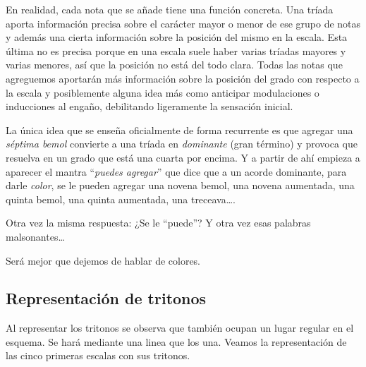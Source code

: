 \documentclass[]{report}
\begin{document}
En realidad, cada nota que se añade tiene una función concreta. Una tríada aporta información precisa sobre el carácter mayor o menor de ese grupo de notas y además una cierta información sobre la posición del mismo en la escala. Esta última no es precisa porque en una escala suele haber varias tríadas mayores y varias menores, así que la posición no está del todo clara. Todas las notas que agreguemos aportarán más información sobre la posición del grado con respecto a la escala y posiblemente alguna idea más como anticipar modulaciones o inducciones al engaño, debilitando ligeramente la sensación inicial.

La única idea que se enseña oficialmente de forma recurrente es que agregar una \emph{séptima bemol} convierte a una tríada en \emph{dominante} (gran término) y provoca que resuelva en un grado que está una cuarta por encima. Y a partir de ahí empieza a aparecer el mantra ``\emph{puedes agregar}'' que dice que a un acorde dominante, para darle \emph{color}, se le pueden agregar una novena bemol, una novena aumentada, una quinta bemol, una quinta aumentada, una treceava\ldots.

Otra vez la misma respuesta: ¿Se le ``puede''? Y otra vez esas palabras malsonantes\ldots{}

Será mejor que dejemos de hablar de colores.

\subsection{Representación de tritonos}

Al representar los tritonos se observa que también ocupan un lugar regular en el
esquema. Se hará mediante una linea que los una. Veamos la representación de las
cinco primeras escalas con sus tritonos.
\end{document}
